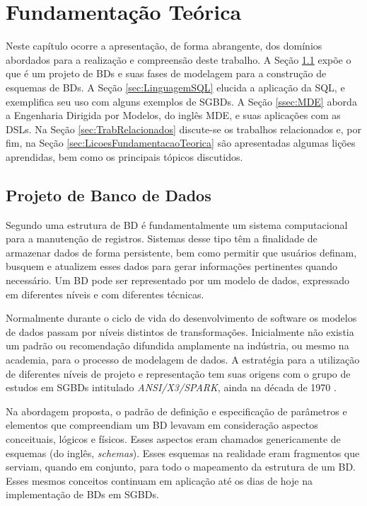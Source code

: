 \chapter{Fundamentação Teórica}\label{fundamentacaoTeorica}

Neste capítulo ocorre a apresentação, de forma abrangente, dos domínios abordados para a realização e compreensão deste trabalho. 
A Seção \ref{sec:ProjetoBD} expõe o que é um projeto de \acp{BD} e suas fases de modelagem para a construção de esquemas de \acp{BD}. 
A Seção \ref{sec:LinguagemSQL} elucida a aplicação da \ac{SQL}, e exemplifica seu uso com alguns exemplos de \acp{SGBD}. 
A Seção \ref{ssec:MDE} aborda a Engenharia Dirigida por Modelos, do inglês \ac{MDE}, e suas aplicações com as \acp{DSL}. 
Na Seção \ref{sec:TrabRelacionados} discute-se os trabalhos relacionados e, por fim, na Seção \ref{sec:LicoesFundamentacaoTeorica} são apresentadas algumas lições aprendidas, bem como os principais tópicos discutidos.

\section{Projeto de Banco de Dados} \label{sec:ProjetoBD}

Segundo  uma estrutura de \ac{BD} é fundamentalmente um sistema computacional para a manutenção de registros. 
Sistemas desse tipo têm a finalidade de armazenar dados de forma persistente, bem como permitir que usuários definam, busquem e atualizem esses dados para gerar informações pertinentes quando necessário. 
Um \ac{BD} pode ser representado por um modelo de dados, expressado em diferentes níveis e com diferentes técnicas.

Normalmente durante o ciclo de vida do desenvolvimento de software os modelos de dados passam por níveis distintos de transformações. 
Inicialmente não existia um padrão ou recomendação difundida amplamente na indústria, ou mesmo na academia, para o processo de modelagem de dados. 
A estratégia para a utilização de diferentes níveis de projeto e representação tem suas origens com o grupo de estudos em \acp{SGBD} intitulado \textit{ANSI/X3/SPARK}, ainda na década de 1970 \cite{DBLP:1975}.  

Na abordagem proposta, o padrão de definição e especificação de parâmetros e elementos que compreendiam um \ac{BD} levavam em consideração aspectos conceituais, lógicos e físicos. 
Esses aspectos eram chamados genericamente de esquemas (do inglês, \textit{schemas}). 
Esses esquemas na realidade eram fragmentos que serviam, quando em conjunto, para todo o mapeamento da estrutura de um \ac{BD}. 
Esses mesmos conceitos continuam em aplicação até os dias de hoje na implementação de \acp{BD} em \acp{SGBD}.  

